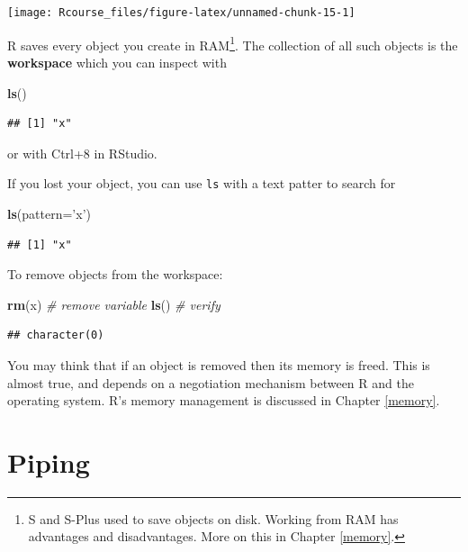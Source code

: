 \documentclass[]{book}
\newenvironment{Shaded}{\begin{snugshade}}{\end{snugshade}}
\newcommand{\KeywordTok}[1]{\textcolor[rgb]{0.13,0.29,0.53}{\textbf{{#1}}}}
\newcommand{\DataTypeTok}[1]{\textcolor[rgb]{0.13,0.29,0.53}{{#1}}}
\newcommand{\StringTok}[1]{\textcolor[rgb]{0.31,0.60,0.02}{{#1}}}
\newcommand{\CommentTok}[1]{\textcolor[rgb]{0.56,0.35,0.01}{\textit{{#1}}}}
\newcommand{\NormalTok}[1]{{#1}}
\theoremstyle{definition}
\theoremstyle{definition}
\theoremstyle{remark}
\begin{document}
\texttt{[image: Rcourse\_files/figure-latex/unnamed-chunk-15-1]}

R saves every object you create in RAM\footnote{S and S-Plus used to
  save objects on disk. Working from RAM has advantages and
  disadvantages. More on this in Chapter \ref{memory}.}. The collection
of all such objects is the \textbf{workspace} which you can inspect with

\begin{Shaded}
\begin{Highlighting}[]
\KeywordTok{ls}\NormalTok{()}
\end{Highlighting}
\end{Shaded}

\begin{verbatim}
## [1] "x"
\end{verbatim}

or with Ctrl+8 in RStudio.

If you lost your object, you can use \texttt{ls} with a text patter to
search for

\begin{Shaded}
\begin{Highlighting}[]
\KeywordTok{ls}\NormalTok{(}\DataTypeTok{pattern=}\StringTok{'x'}\NormalTok{)}
\end{Highlighting}
\end{Shaded}

\begin{verbatim}
## [1] "x"
\end{verbatim}

To remove objects from the workspace:

\begin{Shaded}
\begin{Highlighting}[]
\KeywordTok{rm}\NormalTok{(x) }\CommentTok{# remove variable}
\KeywordTok{ls}\NormalTok{() }\CommentTok{# verify}
\end{Highlighting}
\end{Shaded}

\begin{verbatim}
## character(0)
\end{verbatim}

You may think that if an object is removed then its memory is freed.
This is almost true, and depends on a negotiation mechanism between R
and the operating system. R's memory management is discussed in Chapter
\ref{memory}.

\section{Piping}\label{piping}
\end{document}
